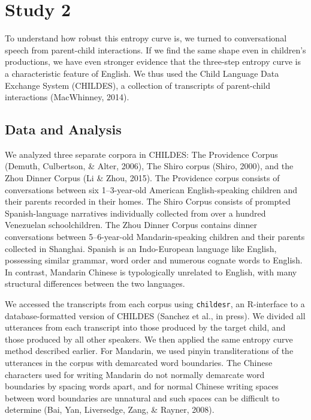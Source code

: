 \documentclass[10pt, letterpaper]{article}
\begin{document}
\section{Study 2}\label{study-2}

To understand how robust this entropy curve is, we turned to
conversational speech from parent-child interactions. If we find the
same shape even in children's productions, we have even stronger
evidence that the three-step entropy curve is a characteristic feature
of English. We thus used the Child Language Data Exchange System
(CHILDES), a collection of transcripts of parent-child interactions
(MacWhinney, 2014).

\subsection{Data and Analysis}\label{data-and-analysis-1}

We analyzed three separate corpora in CHILDES: The Providence Corpus
(Demuth, Culbertson, \& Alter, 2006), The Shiro corpus (Shiro, 2000),
and the Zhou Dinner Corpus (Li \& Zhou, 2015). The Providence corpus
consists of conversations between six 1--3-year-old American
English-speaking children and their parents recorded in their homes. The
Shiro Corpus consists of prompted Spanish-language narratives
individually collected from over a hundred Venezuelan schoolchildren.
The Zhou Dinner Corpus contains dinner conversations between
5--6-year-old Mandarin-speaking children and their parents collected in
Shanghai. Spanish is an Indo-European language like English, possessing
similar grammar, word order and numerous cognate words to English. In
contrast, Mandarin Chinese is typologically unrelated to English, with
many structural differences between the two languages.

We accessed the transcripts from each corpus using \texttt{childesr}, an
R-interface to a database-formatted version of CHILDES (Sanchez et al.,
in press). We divided all utterances from each transcript into those
produced by the target child, and those produced by all other speakers.
We then applied the same entropy curve method described earlier. For
Mandarin, we used pinyin transliterations of the utterances in the
corpus with demarcated word boundaries. The Chinese characters used for
writing Mandarin do not normally demarcate word boundaries by spacing
words apart, and for normal Chinese writing spaces between word
boundaries are unnatural and such spaces can be difficult to determine
(Bai, Yan, Liversedge, Zang, \& Rayner, 2008).
\end{document}
